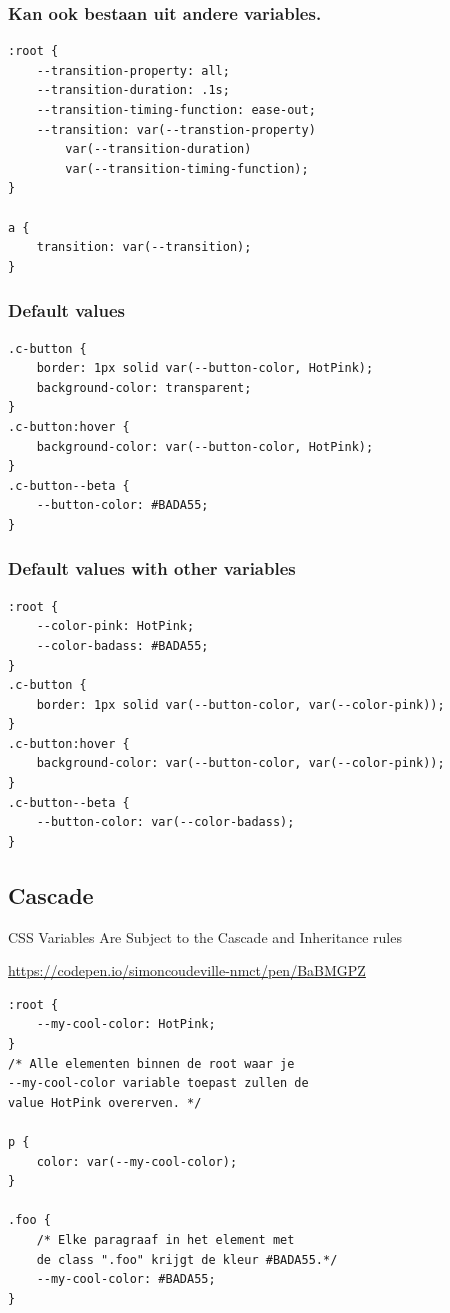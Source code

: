 \documentclass{article}
\begin{document}
\subsubsection{Kan ook bestaan uit andere variables.}

\begin{verbatim}
:root {
    --transition-property: all;
    --transition-duration: .1s;
    --transition-timing-function: ease-out;
    --transition: var(--transtion-property) 
        var(--transition-duration) 
        var(--transition-timing-function);
}

a {
    transition: var(--transition);
}
\end{verbatim}

\subsubsection{Default values}

\begin{verbatim}
.c-button {
    border: 1px solid var(--button-color, HotPink);
    background-color: transparent;
}
.c-button:hover {
    background-color: var(--button-color, HotPink);
}
.c-button--beta {
    --button-color: #BADA55;
}
\end{verbatim}

\subsubsection{Default values with other variables}

\begin{verbatim}
:root {
    --color-pink: HotPink;
    --color-badass: #BADA55;
}
.c-button {
    border: 1px solid var(--button-color, var(--color-pink));
}
.c-button:hover {
    background-color: var(--button-color, var(--color-pink));
}
.c-button--beta {
    --button-color: var(--color-badass);
}
\end{verbatim}

\subsection{Cascade}
CSS Variables Are Subject to the Cascade and Inheritance rules

\url{https://codepen.io/simoncoudeville-nmct/pen/BaBMGPZ}

\begin{verbatim}
:root {
    --my-cool-color: HotPink;
}
/* Alle elementen binnen de root waar je 
--my-cool-color variable toepast zullen de
value HotPink overerven. */

p {
    color: var(--my-cool-color);
}

.foo {
    /* Elke paragraaf in het element met
    de class ".foo" krijgt de kleur #BADA55.*/
    --my-cool-color: #BADA55;
}
\end{verbatim}
\end{document}
